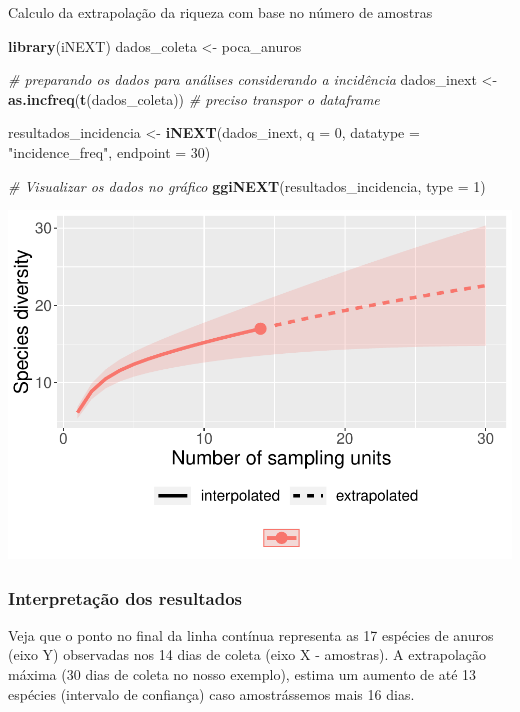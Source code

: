 \documentclass[
]{book}
\newenvironment{Shaded}{\begin{snugshade}}{\end{snugshade}}
\newcommand{\CommentTok}[1]{\textcolor[rgb]{0.56,0.35,0.01}{\textit{#1}}}
\newcommand{\DataTypeTok}[1]{\textcolor[rgb]{0.13,0.29,0.53}{#1}}
\newcommand{\DecValTok}[1]{\textcolor[rgb]{0.00,0.00,0.81}{#1}}
\newcommand{\KeywordTok}[1]{\textcolor[rgb]{0.13,0.29,0.53}{\textbf{#1}}}
\newcommand{\NormalTok}[1]{#1}
\newcommand{\StringTok}[1]{\textcolor[rgb]{0.31,0.60,0.02}{#1}}
\begin{document}
Calculo da extrapolação da riqueza com base no número de amostras

\begin{Shaded}
\begin{Highlighting}[]
\KeywordTok{library}\NormalTok{(iNEXT)}
\NormalTok{dados_coleta <-}\StringTok{ }\NormalTok{poca_anuros}

\CommentTok{# preparando os dados para análises considerando a incidência}
\NormalTok{dados_inext <-}\StringTok{ }\KeywordTok{as.incfreq}\NormalTok{(}\KeywordTok{t}\NormalTok{(dados_coleta)) }\CommentTok{# preciso transpor o dataframe}

\NormalTok{resultados_incidencia <-}\StringTok{ }\KeywordTok{iNEXT}\NormalTok{(dados_inext, }\DataTypeTok{q =} \DecValTok{0}\NormalTok{, }\DataTypeTok{datatype =} \StringTok{"incidence_freq"}\NormalTok{, }
			\DataTypeTok{endpoint =} \DecValTok{30}\NormalTok{)}

\CommentTok{# Visualizar os dados no gráfico}
\KeywordTok{ggiNEXT}\NormalTok{(resultados_incidencia, }\DataTypeTok{type =} \DecValTok{1}\NormalTok{)}
\end{Highlighting}
\end{Shaded}

\includegraphics{livro_r_ecologia_files/figure-latex/unnamed-chunk-56-1.pdf}

\hypertarget{interpretauxe7uxe3o-dos-resultados-7}{%
\subsubsection{Interpretação dos resultados}\label{interpretauxe7uxe3o-dos-resultados-7}}

Veja que o ponto no final da linha contínua representa as 17 espécies de anuros (eixo Y) observadas nos 14 dias de coleta (eixo X - amostras). A extrapolação máxima (30 dias de coleta no nosso exemplo), estima um aumento de até 13 espécies (intervalo de confiança) caso amostrássemos mais 16 dias.
\end{document}
